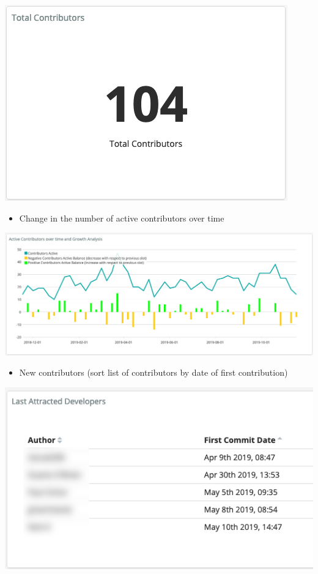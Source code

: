 \includegraphics{images/contributors_summary-contributor-number.png}

\begin{itemize}
\tightlist
\item
  Change in the number of active contributors over time
\end{itemize}

\includegraphics{images/contributors_growth.png}

\begin{itemize}
\tightlist
\item
  New contributors (sort list of contributors by date of first
  contribution)
\end{itemize}

\includegraphics{images/contributors_first-commit-date.png}

